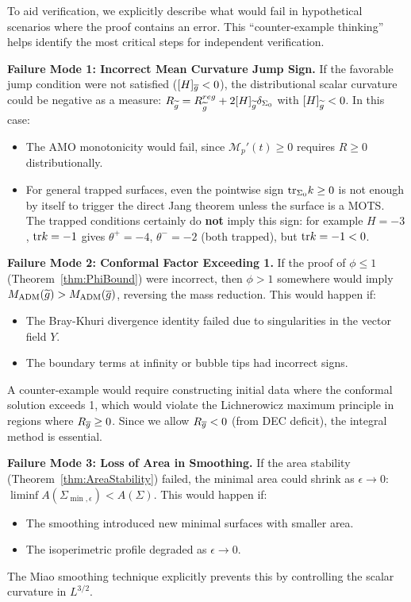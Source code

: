\begin{remark}\label{rem:FailureModes}
To aid verification, we explicitly describe what would fail in hypothetical scenarios where the proof contains an error. This ``counter-example thinking'' helps identify the most critical steps for independent verification.

\textbf{Failure Mode 1: Incorrect Mean Curvature Jump Sign.}
If the favorable jump condition were not satisfied ($[H]_{\overline{g}} < 0$), the distributional scalar curvature could be negative as a measure: $R_{\widetilde{g}} = R_{\widetilde{g}}^{reg} + 2[H]_{\widetilde{g}}\delta_{\Sigma_0}$ with $[H]_{\widetilde{g}} < 0$. In this case:
\begin{itemize}
    \item The AMO monotonicity would fail, since $\mathcal{M}_p'(t) \ge 0$ requires $R \ge 0$ distributionally.
    \item For general trapped surfaces, even the pointwise sign $\mathrm{tr}_{\Sigma_0} k \ge 0$ is not enough by itself to trigger the direct Jang theorem unless the surface is a MOTS. The trapped conditions certainly do \textbf{not} imply this sign: for example $H = -3$, $\mathrm{tr} k = -1$ gives $\theta^+ = -4$, $\theta^- = -2$ (both trapped), but $\mathrm{tr} k = -1 < 0$.
\end{itemize}

\textbf{Failure Mode 2: Conformal Factor Exceeding 1.}
If the proof of $\phi \le 1$ (Theorem~\ref{thm:PhiBound}) were incorrect, then $\phi > 1$ somewhere would imply $M_{\mathrm{ADM}}(\widetilde{g}) > M_{\mathrm{ADM}}(\overline{g})$, reversing the mass reduction. This would happen if:
\begin{itemize}
    \item The Bray-Khuri divergence identity failed due to singularities in the vector field $Y$.
    \item The boundary terms at infinity or bubble tips had incorrect signs.
\end{itemize}
A counter-example would require constructing initial data where the conformal solution exceeds 1, which would violate the Lichnerowicz maximum principle in regions where $R_{\overline{g}} \ge 0$. Since we allow $R_{\overline{g}} < 0$ (from DEC deficit), the integral method is essential.

\textbf{Failure Mode 3: Loss of Area in Smoothing.}
If the area stability (Theorem~\ref{thm:AreaStability}) failed, the minimal area could shrink as $\epsilon \to 0$: $\liminf A(\Sigma_{\min,\epsilon}) < A(\Sigma)$. This would happen if:
\begin{itemize}
    \item The smoothing introduced new minimal surfaces with smaller area.
    \item The isoperimetric profile degraded as $\epsilon \to 0$.
\end{itemize}
The Miao smoothing technique explicitly prevents this by controlling the scalar curvature in $L^{3/2}$.


\end{remark}
